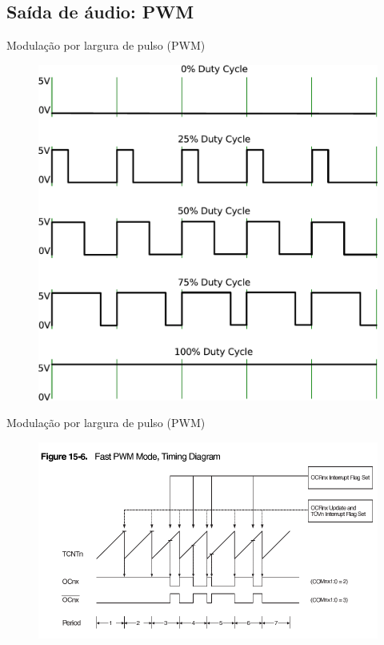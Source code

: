 \subsection{Saída de áudio: PWM}

\begin{frame}{Modulação por largura de pulso (PWM)}
\begin{figure}
\includegraphics[height=0.8\textheight]{./img/pwmmeu.pdf}
\end{figure}
\end{frame}

\begin{frame}{Modulação por largura de pulso (PWM)}
\begin{figure}
\includegraphics[width=\textwidth]{./img/pwm2.pdf}
\end{figure}
\end{frame}

